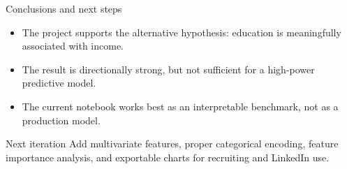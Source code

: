 \documentclass[aspectratio=169]{beamer}
\begin{document}
\begin{frame}{Conclusions and next steps}
  \begin{itemize}
    \item The project supports the alternative hypothesis: education is meaningfully associated with income.
    \item The result is directionally strong, but not sufficient for a high-power predictive model.
    \item The current notebook works best as an interpretable benchmark, not as a production model.
  \end{itemize}

  \begin{block}{Next iteration}
    Add multivariate features, proper categorical encoding, feature importance analysis, and exportable charts for recruiting and LinkedIn use.
  \end{block}
\end{frame}
\end{document}
